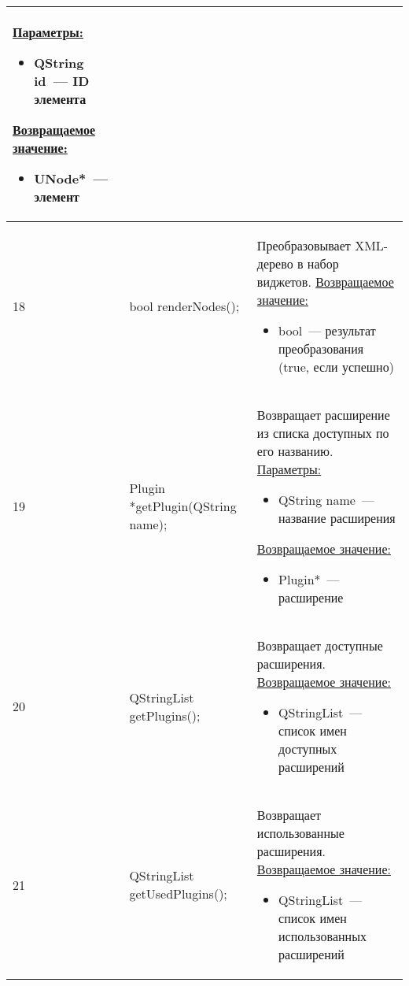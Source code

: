 \begin{longtable}[h]{|p{}|p{}|p{}|}
    \uline{Параметры:}
    \begin{itemize}[nolistsep,label=,leftmargin=0cm]
      \item QString id~--- ID элемента
    \end{itemize}
    \uline{Возвращаемое значение:}
    \begin{itemize}[nolistsep,label=,leftmargin=0cm]
      \item UNode*~--- элемент
    \end{itemize}\\ \hline
  18 & bool renderNodes(); & Преобразовывает XML-дерево в набор виджетов.\newline
    \uline{Возвращаемое значение:}
    \begin{itemize}[nolistsep,label=,leftmargin=0cm]
      \item bool~--- результат преобразования (true, если успешно)
    \end{itemize}\\ \hline
  19 & Plugin     *getPlugin(QString name); & Возвращает расширение из списка доступных по его названию.\newline
    \uline{Параметры:}
    \begin{itemize}[nolistsep,label=,leftmargin=0cm]
      \item QString name~--- название расширения
    \end{itemize}
    \uline{Возвращаемое значение:}
    \begin{itemize}[nolistsep,label=,leftmargin=0cm]
      \item Plugin*~--- расширение
    \end{itemize}\\ \hline
  20 & QStringList getPlugins(); & Возвращает доступные расширения.\newline
    \uline{Возвращаемое значение:}
    \begin{itemize}[nolistsep,label=,leftmargin=0cm]
      \item QStringList~--- список имен доступных расширений
    \end{itemize}\\ \hline
  21 & QStringList getUsedPlugins(); & Возвращает использованные расширения.\newline
    \uline{Возвращаемое значение:}
    \begin{itemize}[nolistsep,label=,leftmargin=0cm]
      \item QStringList~--- список имен использованных расширений
    \end{itemize}\\ \hline

\end{longtable}
